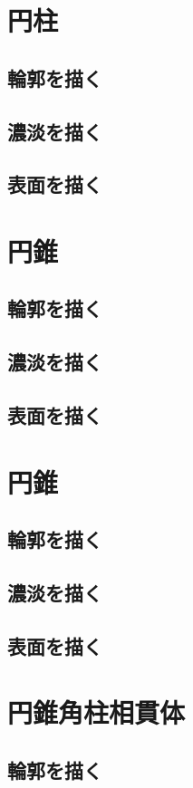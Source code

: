 \documentclass[a4paper,11pt]{jsbook}
\begin{document}
\chapter{円柱}
\section{輪郭を描く}
\section{濃淡を描く}
\section{表面を描く}

\chapter{円錐}
\section{輪郭を描く}
\section{濃淡を描く}
\section{表面を描く}

\chapter{円錐}
\section{輪郭を描く}
\section{濃淡を描く}
\section{表面を描く}

\chapter{円錐角柱相貫体}
\section{輪郭を描く}
\end{document}
